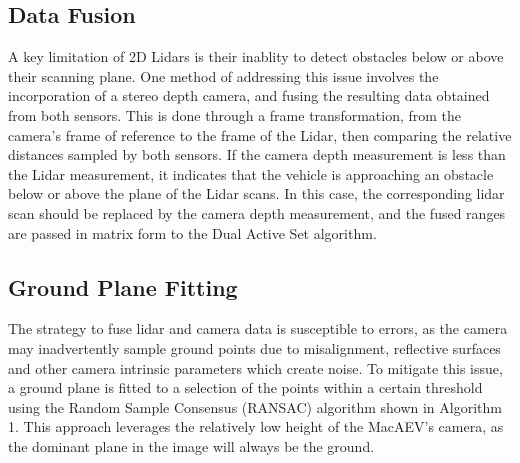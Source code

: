 \documentclass[conference]{IEEEtran}
\begin{document}
\subsection{Data Fusion}

A key limitation of 2D Lidars is their inablity to detect obstacles below or above their scanning plane. One method of addressing this issue involves the incorporation of a stereo depth camera, and fusing the resulting data obtained from both sensors. This is done through a frame transformation, from the camera's frame of reference to the frame of the Lidar, then comparing the relative distances sampled by both sensors. If the camera depth measurement is less than the Lidar measurement, it indicates that the vehicle is approaching an obstacle below or above the plane of the Lidar scans. In this case, the corresponding lidar scan should be replaced by the camera depth measurement, and the fused ranges are passed in matrix form to the Dual Active Set algorithm. 






\subsection{Ground Plane Fitting}


The strategy to fuse lidar and camera data is susceptible to errors, as the camera may inadvertently sample ground points due to misalignment, reflective surfaces and other camera intrinsic parameters which create noise. To mitigate this issue, a ground plane is fitted to a selection of the points within a certain threshold using the Random Sample Consensus (RANSAC) algorithm shown in Algorithm 1. This approach leverages the relatively low height of the MacAEV's camera, as the dominant plane in the image will always be the ground. 
\end{document}
